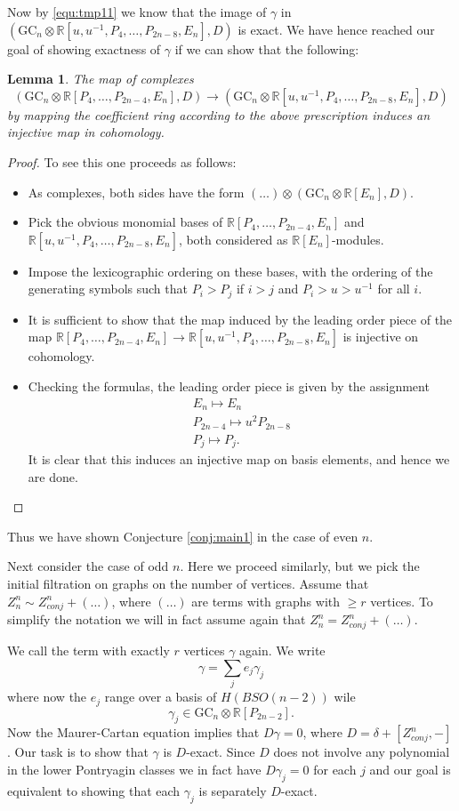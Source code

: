 \documentclass[a4paper]{amsart}
\theoremstyle{plain}
\newtheorem{lemma}[thm]{Lemma}
\theoremstyle{definition}
\newcommand{\R}{{\mathbb{R}}}
\newcommand{\GC}{\mathrm{GC}}
\newcommand{\SO}{\mathit{SO}}
\begin{document}
Now by \eqref{equ:tmp11} we know that the image of $\gamma$ in  $(\GC_n \otimes \R[u,u^{-1}, P_4,\dots,P_{2n-8},E_n], D)$ is exact. We have hence reached our goal of showing exactness of $\gamma$ if we can show that the following:
\begin{lemma}
The map of complexes
\[
(\GC_n \otimes \R[P_4,\dots,P_{2n-4},E_n], D)
\to 
(\GC_n \otimes \R[u,u^{-1}, P_4,\dots,P_{2n-8},E_n], D)
\]
by mapping the coefficient ring according to the above prescription induces an injective map in cohomology.
\end{lemma}
\begin{proof}
To see this one proceeds as follows:
\begin{itemize}
\item As complexes, both sides have the form $(\dots)\otimes (\GC_n\otimes \R[E_n],D)$.
\item Pick the obvious monomial bases of $\R[P_4,\dots,P_{2n-4},E_n]$ and $ \R[u,u^{-1}, P_4,\dots,P_{2n-8},E_n]$, both considered as $\R[E_n]$-modules.
\item Impose the lexicographic ordering on these bases, with the ordering of the generating symbols such that  $P_i>P_j$ if $i>j$ and $P_i>u>u^{-1}$ for all $i$.
\item It is sufficient to show that the map induced by the leading order piece of the map $\R[P_4,\dots,P_{2n-4},E_n] \to \R[u,u^{-1}, P_4,\dots,P_{2n-8},E_n]$ is injective on cohomology.
\item Checking the formulas, the leading order piece is given by the assignment 
\begin{align*}
E_n\mapsto E_n \\ 
P_{2n-4}\mapsto u^2 P_{2n-8} \\
P_j\mapsto P_j .
\end{align*}
It is clear that this induces an injective map on basis elements, and hence we are done.
\end{itemize}
\end{proof}
Thus we have shown Conjecture \ref{conj:main1} in the case of even $n$.

Next consider the case of odd $n$. Here we proceed similarly, but we pick the initial filtration on graphs on the number of vertices.
Assume that $Z_{n}^n \sim Z_{conj}^n + (\dots)$, where $(\dots)$ are terms with graphs with $\geq r$ vertices.
To simplify the notation we will in fact assume again that $Z_{n}^n = Z_{conj}^n + (\dots)$.

We call the term with exactly $r$ vertices $\gamma$ again.
We write 
\[
\gamma =\sum_j e_j \gamma_j
\]
where now the $e_j$ range over a basis of $H(B\SO(n-2))$ wile 
\[
\gamma_j\in \GC_n \otimes \R[P_{2n-2}].
\]
Now the Maurer-Cartan equation implies that $D\gamma=0$, where $D=\delta+[Z_{conj}^n,-]$.
Our task is to show that $\gamma$ is $D$-exact. Since $D$ does not involve any polynomial in the lower Pontryagin classes we in fact have $D\gamma_j=0$ for each $j$ and our goal is equivalent to showing that each $\gamma_j$ is separately $D$-exact.
\end{document}
